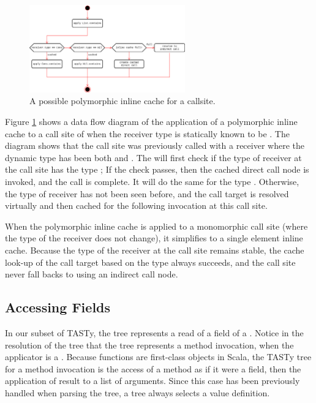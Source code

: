 \begin{figure}[!htb]
	\centering
	\includegraphics[width=0.6\textwidth]{figures/tastytruffle-pic-example.png}
	\caption{A possible polymorphic inline cache for a  callsite.}
	\label{example:poly-cache-call-node}
\end{figure}

Figure \ref{example:poly-cache-call-node} shows a data flow diagram of the application of a polymorphic inline cache to a call site of  when the receiver type is statically known to be . 
The diagram shows that the call site was previously called with a receiver where the dynamic type has been both  and .
The  will first check if the type of receiver at the call site has the type ; If the check passes, then the cached direct call node is invoked, and the call is complete.
It will do the same for the type .
Otherwise, the type of receiver has not been seen before, and the call target is resolved virtually and then cached for the following invocation at this call site.

When the polymorphic inline cache is applied to a monomorphic call site (where the type of the receiver does not change), it simplifies to a single element inline cache\cite{smalltalk:inline-caches}. 
Because the type of the receiver at the call site remains stable, the cache look-up of the call target based on the type always succeeds, and the call site never fall backs to using an indirect call node.

\subsection{Accessing Fields}

In our subset of TASTy, the  tree represents a read of a field of a .
Notice in the resolution of the  tree that the  tree represents a method invocation, when the applicator is a .
Because functions are first-class objects in Scala, the TASTy tree for a method invocation is the access of a method as if it were a field, then the application of result to a list of arguments.
Since this case has been previously handled when parsing the  tree, a  tree always selects a value definition.

